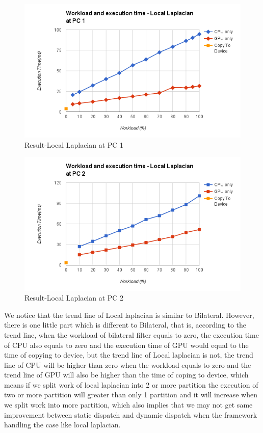 \begin{figure}[hbtp]
\centering
\includegraphics[width=12cm]{img/Result-WorkloadbetweenCPUandGPU(LocalLaplacian@PC1).png}
\caption{Result-Local Laplacian at PC 1 }
\label{fig:my_label}
\end{figure}

\begin{figure}[hbtp]
\centering
\includegraphics[width=12cm]{img/Result-WorkloadbetweenCPUandGPU(LocalLaplacian@PC2).png}
\caption{Result-Local Laplacian at PC 2 }
\label{fig:my_label}
\end{figure}

We notice that the trend line of Local laplacian is similar to Bilateral. However, there is one little part which is different to Bilateral, that is, according to the trend line, when the workload of bilateral filter equals to zero, the execution time of CPU also equals to zero and the execution time of GPU would equal to the time of copying to device, but the trend line of Local laplacian is not, the trend line of CPU will be higher than zero when the workload equals to zero  and the trend line of GPU will also be higher than the time of coping to device, which means if we split work of local laplacian into 2 or more partition the execution of two or more partition will greater than only 1 partition and it will increase when we split work into more partition, which also implies that we may not get same improvement between static dispatch and dynamic dispatch when the framework handling the case like local laplacian.

